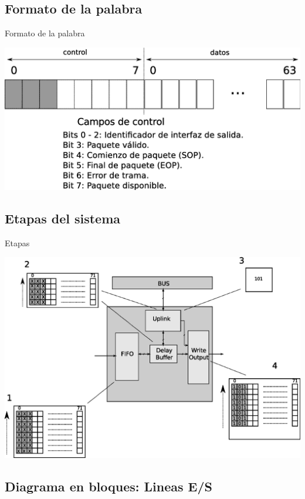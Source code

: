 \documentclass[xcolor=dvipsnames]{beamer}
\begin{document}
\subsection{Formato de la palabra}
\begin{frame}{Formato de la palabra}

\center 
\includegraphics[scale=0.35]{figures/datocontrol.eps}

\end{frame}

\subsection{Etapas del sistema}
\begin{frame}{Etapas}

\center 
\includegraphics[scale=0.35]{figures/moduloexp.eps}

\end{frame}

\subsection{Diagrama en bloques: Lineas E/S}
\end{document}
